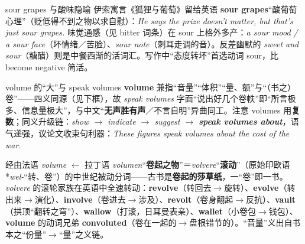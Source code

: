 \documentclass[../main.tex]{subfiles}
\begin{document}

\begin{gram}{sour grapes 与酸味隐喻}
伊索寓言《狐狸与葡萄》留给英语 \textbf{sour grapes}“酸葡萄心理”（贬低得不到之物以求自慰）：\textit{He says the prize doesn't matter, but that's just sour grapes.} 味觉通感（见 bitter 词条）在 sour 上格外多产：\textit{a sour mood / a sour face}（坏情绪／苦脸）、\textit{sour note}（刺耳走调的音）。反差幽默的 \textit{sweet and sour}（糖醋）则是中餐西渐的活词汇。写作中“态度转坏”首选动词 sour，比 become negative 简活。
\end{gram}



\begin{gram}{volume 的“大”与 speak volumes}
\textbf{volume} 兼指“音量”“体积”“量、额”与“（书之）卷”——四义同源（见下框），故 \textit{speak volumes} 字面“说出好几个卷帙”即“所言极多、信息量极大”，与中文“\textbf{无声胜有声}／不言自明”异曲同工。注意 volumes 用\textbf{复数}；同义升级链：\textit{show $\to$ indicate $\to$ suggest $\to$ \textbf{speak volumes about}}，语气递强，议论文收束句利器：\textit{These figures speak volumes about the cost of the war.}
\end{gram}

\begin{origin}
经由法语 \textit{volume} $\leftarrow$ 拉丁语 \textit{volumen}“\textbf{卷起之物}”＝\textit{volvere}“\textbf{滚动}”（原始印欧语 *\textit{wel-}“转、卷”）的中世纪被动分词——古书是\textbf{卷起的莎草纸}，一“卷”即一书。\textit{volvere} 的滚轮家族在英语中全速转动：\textbf{revolve}（转回去$\to$旋转）、\textbf{evolve}（转出来$\to$演化）、\textbf{involve}（卷进去$\to$涉及）、\textbf{revolt}（卷身翻起$\to$反抗）、\textbf{vault}（拱顶“翻转之穹”）、\textbf{wallow}（打滚，日耳曼表亲）、\textbf{wallet}（小卷包$\to$钱包）、\textbf{volume} 的动词兄弟 \textbf{convoluted}（卷在一起的$\to$盘根错节的）。“音量”义出自书本之“份量”$\to$“量”之义链。
\end{origin}


\end{document}

